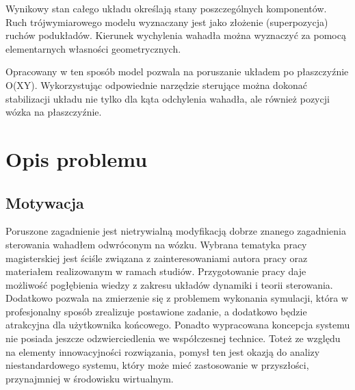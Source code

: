 \documentclass[12pt, oneside]{report}
\theoremstyle{definition}
\begin{document}
Wynikowy stan całego układu określają stany poszczególnych komponentów. Ruch trójwymiarowego modelu wyznaczany jest jako złożenie (superpozycja) ruchów podukładów. Kierunek wychylenia wahadła można wyznaczyć za pomocą elementarnych własności geometrycznych. 

Opracowany w ten sposób model pozwala na poruszanie układem po płaszczyźnie O(XY). Wykorzystując odpowiednie narzędzie sterujące można dokonać stabilizacji układu nie tylko dla kąta odchylenia wahadła, ale również pozycji wózka na płaszczyźnie.

\section{Opis problemu}
\subsection{Motywacja}
Poruszone zagadnienie jest nietrywialną modyfikacją dobrze znanego zagadnienia sterowania wahadłem odwróconym na wózku. Wybrana tematyka pracy magisterskiej jest ściśle związana z zainteresowaniami autora pracy oraz materiałem realizowanym w ramach studiów. Przygotowanie pracy daje możliwość pogłębienia wiedzy z zakresu układów dynamiki i teorii sterowania. Dodatkowo pozwala na zmierzenie się z problemem wykonania symulacji, która w profesjonalny sposób zrealizuje postawione zadanie, a dodatkowo będzie atrakcyjna dla użytkownika końcowego. Ponadto wypracowana koncepcja systemu nie posiada jeszcze odzwierciedlenia we współczesnej technice. Toteż ze względu na elementy innowacyjności rozwiązania, pomysł ten jest okazją do analizy niestandardowego systemu, który może mieć zastosowanie w przyszłości, przynajmniej w środowisku wirtualnym.
\end{document}
